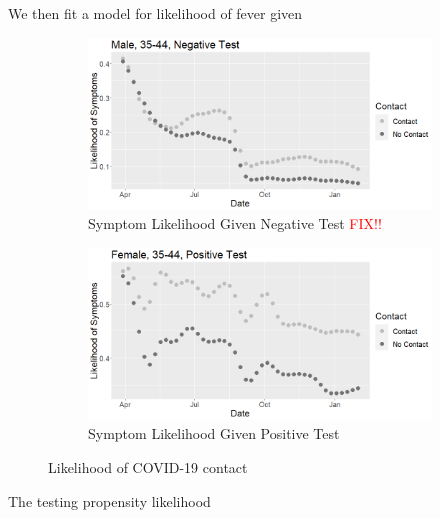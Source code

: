 \documentclass[11pt]{amsart}
\numberwithin{equation}{section}
\theoremstyle{plain}
\begin{document}
We then fit a model for likelihood of fever given

\begin{figure}[!th]
\centering
\begin{subfigure}{.5\textwidth}
 \centering
 \includegraphics[width=.9\linewidth]{../figs/tvprop_symptom_fig1.png}
 \caption{Symptom Likelihood Given Negative Test \textcolor{red}{FIX!!}}
 \label{fig:symptomlik1}
\end{subfigure}%
\begin{subfigure}{.5\textwidth}
 \centering
\includegraphics[width=.9\linewidth]{../figs/tvprop_symptom_fig2.png}
 \caption{Symptom Likelihood Given Positive Test}
 \label{fig:symptomlik2}
\end{subfigure}
\caption{Likelihood of COVID-19 contact}
\label{fig:symptomlik}
\end{figure}

The testing propensity likelihood
\end{document}
